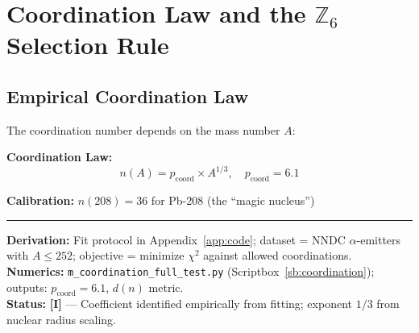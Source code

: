 \documentclass[11pt,a4paper]{article}
\newcommand{\tagI}{\textcolor{orange!80!black}{\textbf{[I]}}}
\begin{document}
\section{Coordination Law and the $\mathbb{Z}_6$ Selection Rule}
\label{sec:coordination_law}

\subsection{Empirical Coordination Law}

The coordination number depends on the mass number $A$:

\begin{resultbox}
\textbf{Coordination Law:}
\begin{equation}
    n(A) = p_{\mathrm{coord}} \times A^{1/3}, \quad p_{\mathrm{coord}} = 6.1
    \label{eq:coordination_law}
\end{equation}

\textbf{Calibration:} $n(208) = 36$ for Pb-208 (the ``magic nucleus'')

\vspace{0.3em}\hrule\vspace{0.3em}
\textbf{Derivation:} Fit protocol in Appendix~\ref{app:code}; dataset = NNDC $\alpha$-emitters with $A \leq 252$; objective = minimize $\chi^2$ against allowed coordinations.\\
\textbf{Numerics:} \texttt{m\_coordination\_full\_test.py} (Scriptbox~\ref{sb:coordination}); outputs: $p_{\mathrm{coord}} = 6.1$, $d(n)$ metric.\\
\textbf{Status:} \tagI{} --- Coefficient identified empirically from fitting; exponent $1/3$ from nuclear radius scaling.
\end{resultbox}

\begin{center}
\end{center}
\end{document}
